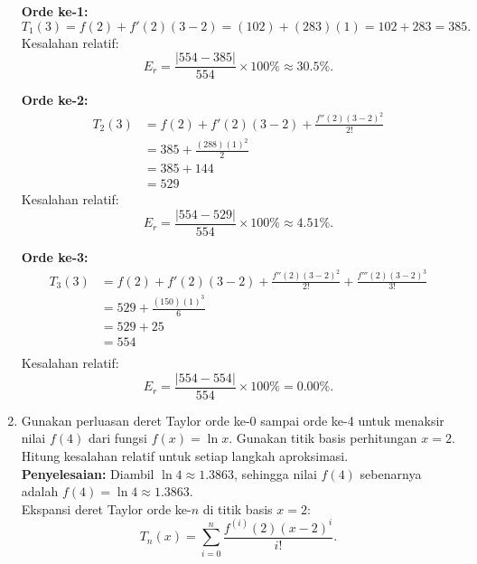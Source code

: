 \documentclass{article}
\newcommand{\penyelesaian}{\textbf{Penyelesaian: }}
\begin{document}
\begin{enumerate}
    \textbf{Orde ke-1:} 
    \begin{equation*}
        T_1(3) = f(2) + f'(2)(3-2) = (102) + (283)(1) = 102 + 283 = 385.
    \end{equation*}
    Kesalahan relatif:
    \begin{equation*}
        E_r = \frac{\left|554 - 385\right|}{554} \times 100\% \approx \num{30,5}\%.
    \end{equation*}
    
    \textbf{Orde ke-2:} 
    \begin{align*}
        T_2(3) 
        &= f(2) + f'(2)(3-2) + \frac{f''(2)(3-2)^2}{2!} \\
        &= 385 + \frac{(288)(1)^2}{2} \\
        &= 385 + 144 \\
        &= 529
    \end{align*}
    Kesalahan relatif:
    \begin{equation*}
        E_r = \frac{\left|554 - 529\right|}{554} \times 100\% \approx \num{4,51}\%.
    \end{equation*}
    
    \textbf{Orde ke-3:} 
    \begin{align*}
        T_3(3) 
        &= f(2) + f'(2)(3-2) + \frac{f''(2)(3-2)^2}{2!} + \frac{f'''(2)(3-2)^3}{3!} \\
        &= 529 + \frac{(150)(1)^3}{6} \\
        &= 529 +  25\\
        &= 554 \\ 
    \end{align*}
    Kesalahan relatif:
    \begin{equation*}
        E_r = \frac{\left|554 - 554\right|}{554} \times 100\% = \num{0,00}\%.
    \end{equation*}

    \item Gunakan perluasan deret Taylor orde ke-0 sampai orde ke-4 untuk menaksir nilai $f(4)$ dari fungsi $f(x) = \ln x$.  
    Gunakan titik basis perhitungan $x = 2$. Hitung kesalahan relatif untuk setiap langkah aproksimasi. \\
    \penyelesaian Diambil $\ln{4} \approx \num{1,3863}$, sehingga nilai $f(4)$ sebenarnya adalah $f(4) = \ln{4} \approx \num{1,3863}$. \\
    
    Ekspansi deret Taylor orde ke-$n$ di titik basis $x = 2$:
    \begin{equation*}
        T_n(x) = \sum_{i=0}^{n}\frac{f^{(i)}(2)(x-2)^i}{i!}.
    \end{equation*}
    

\end{enumerate}
\end{document}
